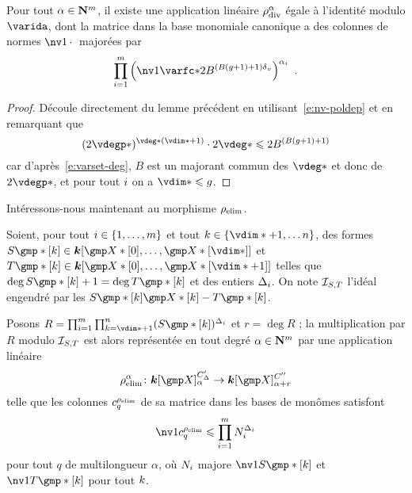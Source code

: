 \begin{coro} \label{c:hmat-rdiv}
  Pour tout \( \alpha \in {\mathbf{N}}^m \), il existe une application linéaire \(
    \rho\sb{\mathrm{div }}^\alpha \) égale à l'identité modulo \( \varida \), dont la matrice
  dans la base monomiale canonique a des colonnes de normes \( \nv1\truc \)
  majorées par
  \begin{equation}
    \prod\fctrange \left(
    \nv1{ \varfc* }
    2 B^{(B(g+1) + 1)\dv}
  \right) ^{ \alpha_\fct }
  \pmm.
  \end{equation}
\end{coro}

\begin{proof}
  Découle directement du lemme précédent en utilisant~\eqref{e:nv-poldep} et
  en remarquant que
  \begin{equation}
    ( 2 \vdegp* )^{\vdeg* (\vdim* + 1)} \cdot 2 \vdeg*
    \le
    2 B^{(B(g+1) + 1)}
  \end{equation}
  car d'après~\eqref{e:varset-deg}, \( B \) est un majorant commun des \(
    \vdeg* \) et donc de \( 2\vdegp* \), et pour tout \( i \) on a \(
    \vdim* \le g \).
\end{proof}

Intéressons-nous maintenant au morphisme \( \rho\sb{\mathrm{elim}} \).

\begin{lem}
  Soient, pour tout \( i \in \{ 1, \dots, m \} \) et tout \( \ind \in
  \{ \vdim* + 1, \dots n \} \), des formes
  \( S\mexp*[\ind] \in \cdn [ \vmp*[0], \dots, \vmp*[\vdim*] ] \) et
  \( T\mexp*[\ind] \in \cdn [ \vmp*[0], \dots, \vmp*[\vdim*+1] ] \)
  telles que \( \deg S\mexp*[\ind] + 1 = \deg T\mexp*[\ind] \) et des entiers
  \( \Delta_i \). On note \( \mathcal I_{S, T} \) l'idéal engendré par les
  \( S\mexp*[\ind] \vmp*[\ind] - T\mexp*[\ind] \).

  Posons
  \( R = \prod\fctrange \prod_{\ind = \vdim*+1}^{n}
    ( S\mexp*[\ind] )^{\Delta_\fct} \) et \( r = \deg R \) ; la multiplication
  par \( R \) modulo \( \mathcal I_{S, T} \) est alors représentée en tout degré
  \( \alpha \in {\mathbf{N}}^m \) par une application linéaire
  \begin{equation}
    \relim^\alpha \colon
    \cdn [\vmp]_ {\alpha}^{C'_\Delta}
    \to
    \cdn [\vmp]_ {\alpha+r}^{C''}
  \end{equation}
  telle que les colonnes \( c_q^{\rho\sb{\mathrm{elim}}} \) de sa matrice dans les bases de
  monômes satisfont
  \begin{equation}
    \nv1{ c_q^{\relim} }
    \le
    \prod\fctrange N_\fct^{\Delta_\fct}
  \end{equation}
  pour tout \( q \) de multilongueur \( \alpha \), où \( N_i \) majore
  \( \nv1{ S\mexp*[\ind] } \) et \( \nv1{ T\mexp*[\ind] } \) pour tout
  \( k \).
\end{lem}


